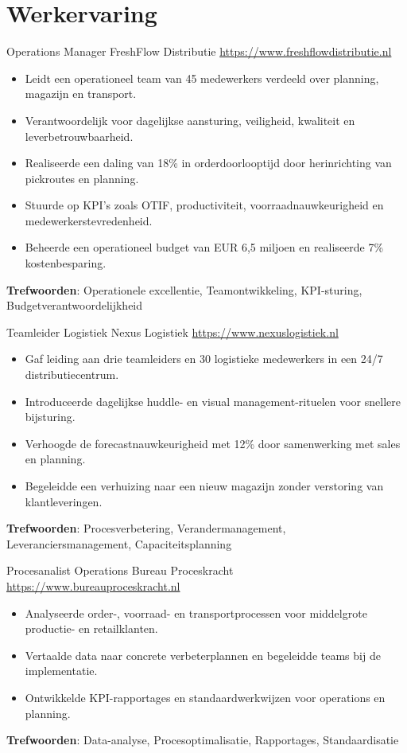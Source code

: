 \documentclass[a4paper, serif, 10pt]{moderncv}
\begin{document}
\section{Werkervaring}

        {Operations Manager}
        {FreshFlow Distributie}
        {\url{https://www.freshflowdistributie.nl}}
        {}
        {\begin{itemize}
\item Leidt een operationeel team van 45 medewerkers verdeeld over planning, magazijn en transport.
\item Verantwoordelijk voor dagelijkse aansturing, veiligheid, kwaliteit en leverbetrouwbaarheid.
\item Realiseerde een daling van 18\% in orderdoorlooptijd door herinrichting van pickroutes en planning.
\item Stuurde op KPI's zoals OTIF, productiviteit, voorraadnauwkeurigheid en medewerkerstevredenheid.
\item Beheerde een operationeel budget van EUR 6,5 miljoen en realiseerde 7\% kostenbesparing.
\end{itemize}
\textbf{Trefwoorden}: Operationele excellentie, Teamontwikkeling, KPI-sturing, Budgetverantwoordelijkheid}

        {Teamleider Logistiek}
        {Nexus Logistiek}
        {\url{https://www.nexuslogistiek.nl}}
        {}
        {\begin{itemize}
\item Gaf leiding aan drie teamleiders en 30 logistieke medewerkers in een 24/7 distributiecentrum.
\item Introduceerde dagelijkse huddle- en visual management-rituelen voor snellere bijsturing.
\item Verhoogde de forecastnauwkeurigheid met 12\% door samenwerking met sales en planning.
\item Begeleidde een verhuizing naar een nieuw magazijn zonder verstoring van klantleveringen.
\end{itemize}
\textbf{Trefwoorden}: Procesverbetering, Verandermanagement, Leveranciersmanagement, Capaciteitsplanning}

        {Procesanalist Operations}
        {Bureau Proceskracht}
        {\url{https://www.bureauproceskracht.nl}}
        {}
        {\begin{itemize}
\item Analyseerde order-, voorraad- en transportprocessen voor middelgrote productie- en retailklanten.
\item Vertaalde data naar concrete verbeterplannen en begeleidde teams bij de implementatie.
\item Ontwikkelde KPI-rapportages en standaardwerkwijzen voor operations en planning.
\end{itemize}
\textbf{Trefwoorden}: Data-analyse, Procesoptimalisatie, Rapportages, Standaardisatie}
\end{document}
